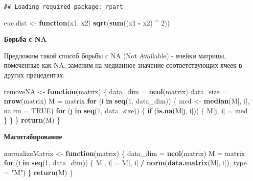 \documentclass[
]{article}
\newenvironment{Shaded}{\begin{snugshade}}{\end{snugshade}}
\newcommand{\ControlFlowTok}[1]{\textcolor[rgb]{0.13,0.29,0.53}{\textbf{#1}}}
\newcommand{\DataTypeTok}[1]{\textcolor[rgb]{0.13,0.29,0.53}{#1}}
\newcommand{\DecValTok}[1]{\textcolor[rgb]{0.00,0.00,0.81}{#1}}
\newcommand{\KeywordTok}[1]{\textcolor[rgb]{0.13,0.29,0.53}{\textbf{#1}}}
\newcommand{\NormalTok}[1]{#1}
\newcommand{\OperatorTok}[1]{\textcolor[rgb]{0.81,0.36,0.00}{\textbf{#1}}}
\newcommand{\OtherTok}[1]{\textcolor[rgb]{0.56,0.35,0.01}{#1}}
\newcommand{\StringTok}[1]{\textcolor[rgb]{0.31,0.60,0.02}{#1}}
\begin{document}
\begin{verbatim}
## Loading required package: rpart
\end{verbatim}

\begin{Shaded}
\begin{Highlighting}[]
\NormalTok{euc.dist <-}\StringTok{ }\ControlFlowTok{function}\NormalTok{(x1, x2)}
  \KeywordTok{sqrt}\NormalTok{(}\KeywordTok{sum}\NormalTok{((x1 }\OperatorTok{-}\StringTok{ }\NormalTok{x2) }\OperatorTok{^}\StringTok{ }\DecValTok{2}\NormalTok{))}
\end{Highlighting}
\end{Shaded}

\textbf{Борьба с NA}

Предложим такой способ борьбы с NA (Not Available) - ячейки матрицы,
помеченные как NA, заменим на медианное значение соответствующих ячеек в
других прецедентах:

\begin{Shaded}
\begin{Highlighting}[]
\NormalTok{removeNA <-}\StringTok{ }\ControlFlowTok{function}\NormalTok{(matrix) \{}
\NormalTok{  data_dim =}\StringTok{ }\KeywordTok{ncol}\NormalTok{(matrix)}
\NormalTok{  data_size =}\StringTok{ }\KeywordTok{nrow}\NormalTok{(matrix)}
\NormalTok{  M =}\StringTok{ }\NormalTok{matrix}
  \ControlFlowTok{for}\NormalTok{ (i }\ControlFlowTok{in} \KeywordTok{seq}\NormalTok{(}\DecValTok{1}\NormalTok{, data_dim)) \{}
\NormalTok{    med <-}\StringTok{ }\KeywordTok{median}\NormalTok{(M[, i], }\DataTypeTok{na.rm =} \OtherTok{TRUE}\NormalTok{)}
    \ControlFlowTok{for}\NormalTok{ (j }\ControlFlowTok{in} \KeywordTok{seq}\NormalTok{(}\DecValTok{1}\NormalTok{, data_size)) \{}
      \ControlFlowTok{if}\NormalTok{ (}\KeywordTok{is.na}\NormalTok{(M[j, i])) \{}
\NormalTok{        M[j, i] =}\StringTok{ }\NormalTok{med}
\NormalTok{      \}}
\NormalTok{    \}}
\NormalTok{  \}}
  \KeywordTok{return}\NormalTok{(M)}
\NormalTok{\}}
\end{Highlighting}
\end{Shaded}

\textbf{Масштабирование}

\begin{Shaded}
\begin{Highlighting}[]
\NormalTok{normalizeMatrix <-}\StringTok{ }\ControlFlowTok{function}\NormalTok{(matrix) \{}
\NormalTok{  data_dim =}\StringTok{ }\KeywordTok{ncol}\NormalTok{(matrix)}
\NormalTok{  M =}\StringTok{ }\NormalTok{matrix}
  \ControlFlowTok{for}\NormalTok{ (i }\ControlFlowTok{in} \KeywordTok{seq}\NormalTok{(}\DecValTok{1}\NormalTok{, data_dim)) \{}
\NormalTok{    M[, i] =}\StringTok{ }\NormalTok{M[, i] }\OperatorTok{/}\StringTok{ }\KeywordTok{norm}\NormalTok{(}\KeywordTok{data.matrix}\NormalTok{(M[, i]), }\DataTypeTok{type =} \StringTok{"M"}\NormalTok{)}
\NormalTok{  \}}
  \KeywordTok{return}\NormalTok{(M)}
\NormalTok{\}}
\end{Highlighting}
\end{Shaded}
\end{document}
